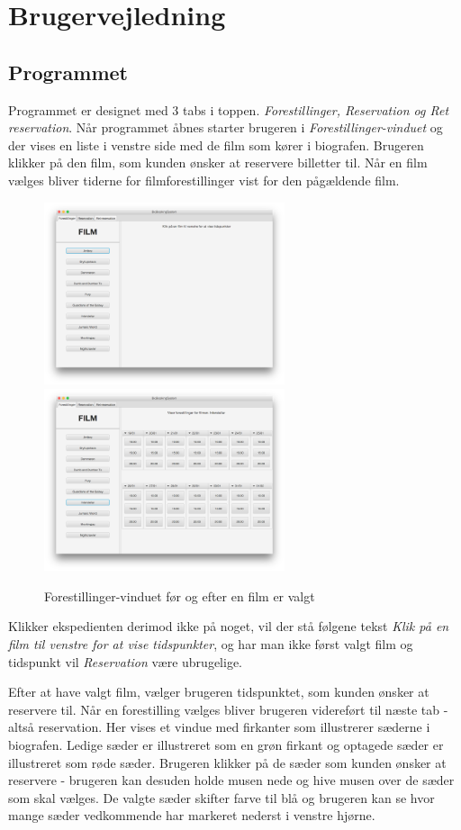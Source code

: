 \documentclass[final]{report}
\begin{document}
\chapter{Brugervejledning}
\section{Programmet}
Programmet er designet med 3 tabs i toppen. \emph{Forestillinger, Reservation og Ret reservation}. Når programmet åbnes starter brugeren i \emph{Forestillinger-vinduet} og der vises en liste i venstre side med de film som kører i biografen. Brugeren klikker på den film, som kunden ønsker at reservere billetter til. Når en film vælges bliver tiderne for filmforestillinger vist for den pågældende film. \\


\begin{figure}[h]
\centering
\includegraphics[width=200pt]{1.png}
\includegraphics[width=200pt]{2.png}
\caption{Forestillinger-vinduet før og efter en film er valgt}
\end{figure}



Klikker ekspedienten derimod ikke på noget, vil der stå følgene tekst \emph{Klik på en film til venstre for at vise tidspunkter}, og har man ikke først valgt film og tidspunkt vil \emph{Reservation} være ubrugelige.

Efter at have valgt film, vælger brugeren tidspunktet, som kunden ønsker at reservere til. Når en forestilling vælges bliver brugeren videreført til næste tab - altså reservation. Her vises et vindue med firkanter som illustrerer sæderne i biografen. Ledige sæder er illustreret som en grøn firkant og optagede sæder er illustreret som røde sæder. Brugeren klikker på de sæder som kunden ønsker at reservere - brugeren kan desuden holde musen nede og hive musen over de sæder som skal vælges. De valgte sæder skifter farve til blå og brugeren kan se hvor mange sæder vedkommende har markeret nederst i venstre hjørne. 
\end{document}
